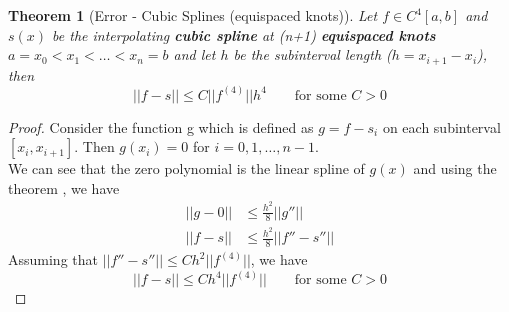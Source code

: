 \documentclass{article}
\newtheorem*{theorem}{Theorem}
\begin{document}
	\begin{theorem}[Error - Cubic Splines (equispaced knots)]
		Let $f\in C^4[a,b]$ and $s(x)$ be the interpolating \textbf{cubic spline} at (n+1) \textbf{equispaced knots} $a=x_0<x_1<\hdots<x_n=b$ and let $h$ be the subinterval length ($h=x_{i+1}-x_i$), then
			\[\boxed{||f-s|| \leq C||f^{(4)}|| h^4 \qquad \text{for some } C>0 }\] 
	\end{theorem}
	\begin{proof}
		Consider the function g which is defined as $g=f-s_i$ on each subinterval $[x_i,x_{i+1}]$.
		Then $g(x_i)=0$ for $i=0,1,\hdots,n-1$.\\
		We can see that the zero polynomial is the linear spline of $g(x)$ and using the theorem , we have
		\begin{align*}
			||g-0|| &\leq \frac{h^2}{8} ||g''||\\
            ||f-s|| &\leq \frac{h^2}{8} ||f'' - s''||
		\end{align*}
		Assuming that $||f''-s''||\leq C h^2 ||f^{(4)}||$, we have
		\[||f-s|| \leq C h^4 ||f^{(4)}|| \qquad \text{for some } C> 0\]
		
	\end{proof}
		
\end{document}
